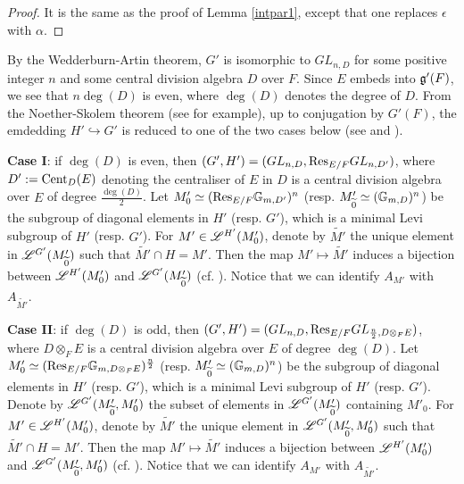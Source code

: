 \documentclass[a4paper]{amsart}
\newcommand{\wt}{\widetilde}                        \newcommand{\wh}{\widehat}                      \newcommand{\wpair}[1]{\left\{{#1}\right\}}
\theoremstyle{definition}
\theoremstyle{remark}
\numberwithin{equation}{subsection}
\begin{document}
\begin{proof}
It is the same as the proof of Lemma \ref{intpar1}, except that one replaces $\epsilon$ with $\alpha$. 
\end{proof}

By the Wedderburn-Artin theorem, $G'$ is isomorphic to $GL_{n,D}$ for some positive integer $n$ and some central division algebra $D$ over $F$. Since $E$ embeds into ${\mathfrak{g}}'(F)$, we see that $n\deg(D)$ is even, where $\deg(D)$ denotes the degree of $D$. From the Noether-Skolem theorem (see \cite[Theorem 2.10 of Chapter IV]{milneCFT} for example), up to conjugation by $G'(F)$, the emdedding $H'\hookrightarrow G'$ is reduced to one of the two cases below (see \cite[\S2.1 and \S3.1]{MR3958071} and \cite[\S3.4]{MR4350885}). 

\textbf{Case I}: if $\deg(D)$ is even, then $(G',H')=(GL_{n,D},{\mathrm{Res}}_{E/F} GL_{n,D'})$, where $D':={\mathrm{Cent}}_D(E)$ denoting the centraliser of $E$ in $D$ is a central division algebra over $E$ of degree $\frac{\deg(D)}{2}$. 
Let $M'_0\simeq ({\mathrm{Res}}_{E/F} {\mathbb {G}}_{m,D'})^n$ (resp. $M'_{\wt{0}}\simeq (\BG_{m,D})^n$) be the subgroup of diagonal elements in $H'$ (resp. $G'$), which is a minimal Levi subgroup of $H'$ (resp. $G'$). For $M'\in\mathscr{L}^{H'}(M'_0)$, denote  by $\wt{M'}$ the unique element in $\msl^{G'}(M'_{\wt{0}})$ such that $\wt{M'}\cap H=M'$. Then the map $M'\mapsto\wt{M'}$ induces a bijection between $\mathscr{L}^{H'}(M'_0)$ and $\msl^{G'}(M'_{\wt{0}})$ (cf. \cite[Case I in \S3.4]{MR4350885}). Notice that we can identify $A_{M'}$ with $A_{\wt{M'}}$. 

\textbf{Case II}: if $\deg(D)$ is odd, then $(G',H')=(GL_{n,D},{\mathrm{Res}}_{E/F} GL_{\frac{n}{2},D\otimes_F E})$, where $D\otimes_F E$ is a central division algebra over $E$ of degree $\deg(D)$. 
Let $M'_0\simeq ({\mathrm{Res}}_{E/F} {\mathbb {G}}_{m,D\otimes_F E})^\frac{n}{2}$ (resp. $M'_{\wt{0}}\simeq (\BG_{m,D})^n$) be the subgroup of diagonal elements in $H'$ (resp. $G'$), which is a minimal Levi subgroup of $H'$ (resp. $G'$). Denote by $\msl^{G'}(M'_{\wt{0}}, M'_0)$ the subset of elements in $\msl^{G'}(M'_{\wt{0}})$ containing $M'_0$. For $M'\in\mathscr{L}^{H'}(M'_0)$, denote  by $\wt{M'}$ the unique element in $\msl^{G'}(M'_{\wt{0}}, M'_0)$ such that $\wt{M'}\cap H=M'$. Then the map $M'\mapsto\wt{M'}$ induces a bijection between $\mathscr{L}^{H'}(M'_0)$ and $\msl^{G'}(M'_{\wt{0}}, M'_0)$ (cf. \cite[Case II in \S3.4]{MR4350885}). Notice that we can identify $A_{M'}$ with $A_{\wt{M'}}$. 
\end{document}
